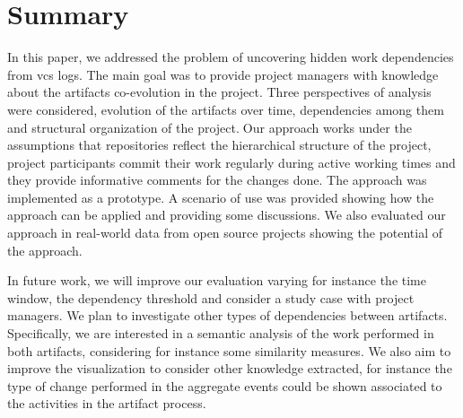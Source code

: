 \section{Summary}
\label{sec:bpm2017conclusion}

In this paper, we addressed the problem of uncovering hidden work dependencies from \gls{vcs} logs. The main goal was to provide project managers with knowledge about the artifacts co-evolution in the project. Three perspectives of analysis were considered, evolution of the artifacts over time, dependencies among them and structural organization of the project.Our approach works under the assumptions that repositories reflect the hierarchical structure of the project, project participants commit their work regularly during active working
times and they provide informative comments for the changes done. The approach was implemented as a prototype. A scenario of use was provided showing how the approach can be applied and providing some discussions. We also evaluated our approach in real-world data from open source projects showing the potential of the approach.

In future work, we will improve our evaluation varying for instance the time window, the dependency threshold and consider a study case with project managers. We plan to investigate other types of dependencies between artifacts. Specifically, we are interested in a semantic analysis of the work performed in both artifacts, considering for instance some similarity measures. We also aim to improve the visualization to consider other knowledge extracted, for instance the type of change performed in the aggregate events could be shown associated to the activities in the artifact process.